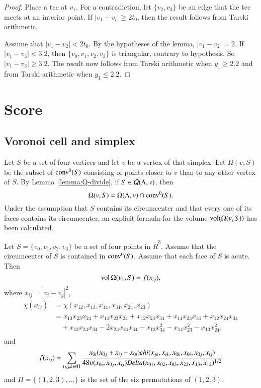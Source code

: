 \begin{proof}
Place a tcc at $v_1$. For a contradiction, let $\{v_2,v_3\}$ be an
edge that the tcc meets at an interior point.  
If $|v_1-v_i|\ge 2t_0$, then the result follows from
Tarski arithmetic.  

Assume that
 $|v_1-v_2|<2t_0$.  By the hypotheses of the lemma,
$|v_1-v_2|=2$.  If $|v_1-v_3|<3.2$, then $\{v_0,v_1,v_2,v_3\}$ is
triangular, contrary to hypothesis.  So $|v_1-v_3|\ge3.2$.
The result now follows from Tarski arithmetic when
$y_1\ge 2.2$ and from Tarski arithmetic when
$y_1\le 2.2$.
\end{proof}








\section{Score}





\subsection{Voronoi cell and simplex}


Let $S$ be a set of four vertices and let $v$ be a vertex of that simplex. Let
$\Omega(v,S)$ be the subset of ${\operatorname{conv}}^0(S)$ consisting of points closer
to $v$ than to any other vertex of $S$. By
Lemma~\ref{lemma:Q-divide}, if $S\in{\mathcal Q}(\Lambda,v)$, then
$$\Omega(v,S) = \Omega(\Lambda,v)\cap{\operatorname{conv}}^0(S).$$
Under the assumption that $S$ contains its circumcenter and that
every one of its faces contains its circumcenter, an explicit
formula for the volume ${\operatorname{vol}}(\Omega(v,S))$ has been
calculated.  %

\begin{lemma}\label{lemma:omega-simp}  Let $S = \{v_0,v_1,v_2,v_3\}$ be a set of four points in $\ring{R}^3$.
Assume that the circumcenter of $S$ is contained in ${\operatorname{conv}}^0(S)$.  Assume
that each face of $S$ is acute.
Then 
  $$
  {\operatorname{vol}}\,\Omega(v_1,S) = f(x_{ij}),
  $$ 
where $x_{ij} = |v_i-v_j|^2$, 
$$
\begin{array}{lll}
\chi(x_{ij}) &= \chi(x_{12},x_{13},x_{14},x_{34},x_{24},x_{23})\\
     &=
      x_{13} x_{23} x_{24} + x_{14} x_{23} x_{24}  + 
      x_{12} x_{23} x_{34} + x_{14} x_{23} x_{34} + x_{12} x_{24} x_{34}\\ 
      &\quad + x_{13} x_{24} x_{34} - 
      2 x_{23} x_{24} x_{34} - x_{12} x_{34}^2 
      - x_{14} x_{23}^2 - x_{13} x_{24}^2,\\
\end{array}
$$
and
$$
   f(x_{ij}) = \sum_{(i,j,k)\in \Pi} \frac{x_{0i} (x_{0j}+x_{ij}-x_{0i})\chi(x_{jk},x_{ik},x_{0k},x_{0i},x_{0j},x_{ij})}
   {48\ups(x_{0i},x_{0j},x_{ij})\Delta(x_{01},x_{02},x_{03},x_{23},x_{13},x_{12})^{1/2}}
$$
and $\Pi = \{(1,2,3),\ldots\}$ is the set of the six permutations of $(1,2,3)$.
\end{lemma}

